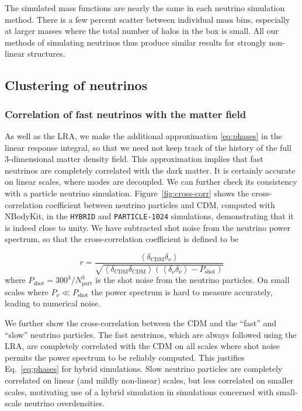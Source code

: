 \documentclass[useAMS, usenatbib]{mnras}
\begin{document}
The simulated mass functions are nearly the same in each neutrino simulation method.
There is a few percent scatter between individual mass bins, especially at larger masses where the total number of halos in the box is small. All our methods of simulating neutrinos thus produce similar results for strongly non-linear structures.

\subsection{Clustering of neutrinos}
\label{sec:nupower}

\subsubsection{Correlation of fast neutrinos with the matter field}

As well as the LRA, we make the additional approximation \eqref{eq:phases} in the linear response integral, so that we need not keep track of the history of the full 3-dimensional matter density field. This approximation implies that fast neutrinos are completely correlated with the dark matter. It is certainly accurate on linear scales, where modes are decoupled. We can further check its consistency with a particle neutrino simulation. Figure~\ref{fig:cross-corr} shows the cross-correlation coefficient between neutrino particles and CDM, computed with NBodyKit, in the \texttt{HYBRID} and \texttt{PARTICLE-1024} simulations, demonstrating that it is indeed close to unity. We have subtracted shot noise from the neutrino power spectrum, so that the cross-correlation coefficient is defined to be

\begin{equation}
 r = \frac{\left<\delta_\mathrm{CDM} \delta_\nu \right>}{\sqrt{\left<\delta_\mathrm{CDM} \delta_\mathrm{CDM} \right>\left(\left<\delta_\nu \delta_\nu \right> - P_\mathrm{shot}\right)}}
\end{equation}
where $P_\mathrm{shot} = 300^3 / N_\mathrm{part}^3$ is the shot noise from the neutrino particles. On small scales where $P_\nu \ll P_\mathrm{shot}$ the power spectrum is hard to measure accurately, leading to numerical noise.

We further show the cross-correlation between the CDM and the ``fast'' and ``slow'' neutrino particles. The fast neutrinos, which are always followed using the LRA, are completely correlated with the CDM on all scales where shot noise permits the power spectrum to be reliably computed. This justifies Eq.~\eqref{eq:phases} for hybrid simulations. Slow neutrino particles are completely correlated on linear (and mildly non-linear) scales, but less correlated on smaller scales, motivating use of a hybrid simulation in simulations concerned with small-scale neutrino overdensities.
\end{document}
